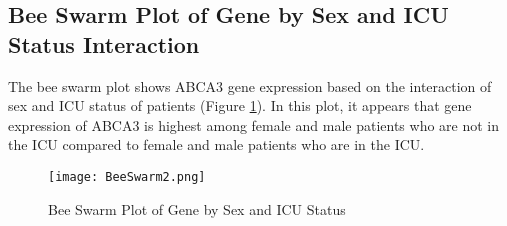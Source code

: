 \documentclass{article}
\begin{document}
        
\subsection{Bee Swarm Plot of Gene by Sex and ICU Status Interaction}      
    \hspace{\parindent}The bee swarm plot shows ABCA3 gene expression based on the interaction of sex and ICU status of patients (Figure \ref{fig:beeswarm}). In this plot, it appears that gene expression of ABCA3 is highest among female and male patients who are not in the ICU compared to female and male patients who are in the ICU. 
    \begin{figure}
        \centering
        \texttt{[image: BeeSwarm2.png]}
        \caption{Bee Swarm Plot of Gene by Sex and ICU Status}
        \label{fig:beeswarm}
    \end{figure}



\end{document}
